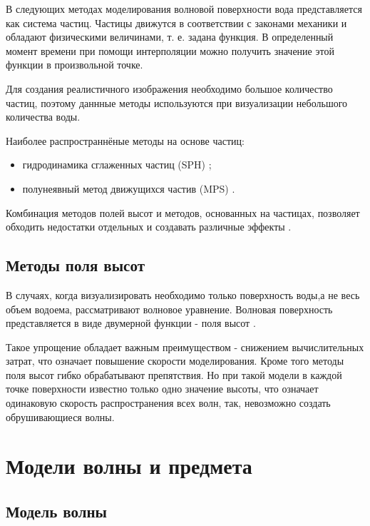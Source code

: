 В следующих методах моделирования волновой поверхности вода представляется как система частиц. Частицы движутся в соответствии с законами механики и обладают физическими величинами, т. е. задана функция. В определенный момент времени при помощи интерполяции можно получить значение этой функции в произвольной точке.

Для создания реалистичного изображения необходимо большое количество частиц, поэтому даннные методы используются при визуализации небольшого количества воды.  

Наиболее распространнёные методы на основе частиц:

\begin{itemize}
    \item гидродинамика сглаженных частиц (SPH) \cite{sph};
    \item полунеявный метод движущихся частив (MPS) \cite{mps}.
\end{itemize}

Комбинация методов полей высот и методов, основанных на частицах, позволяет обходить недостатки отдельных и создавать различные эффекты \cite{shallow}\cite{large-small}.

\subsection{Методы поля высот}

В случаях, когда визуализировать необходимо только поверхность воды,а не весь объем водоема, рассматривают волновое уравнение. Волновая поверхность представляется в виде двумерной функции - поля высот \cite{field}. 

Такое упрощение обладает важным преимуществом - снижением вычислительных затрат, что означает повышение скорости моделирования. Кроме того методы поля высот гибко обрабатывают препятствия. Но при такой модели в каждой точке поверхности известно только одно значение высоты, что означает одинаковую скорость распространения всех волн, так, невозможно создать обрушивающиеся волны.

\section{Модели волны и предмета}

\subsection{Модель волны}



